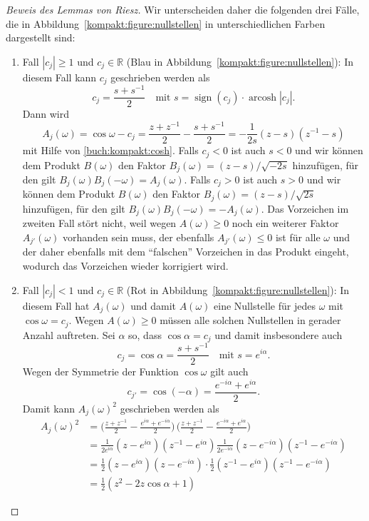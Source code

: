 \begin{proof}[Beweis des Lemmas von Riesz]
Wir unterscheiden daher die folgenden drei Fälle, die in
Abbildung~\ref{kompakt:figure:nullstellen} in unterschiedlichen Farben
dargestellt sind:
\begin{enumerate}
\item
Fall $|c_j|\ge 1$ und $c_j\in\mathbb R$ ({\color{blue}Blau} in
Abbildung~\ref{kompakt:figure:nullstellen}):
In diesem Fall kann $c_j$ geschrieben werden als
\[
c_j = \frac{s+s^{-1}}2
\quad
\text{mit $s=\operatorname{sign}(c_j)\cdot \operatorname{arcosh}|c_j|$.}
\]
Dann wird
\[
A_j(\omega)
=
\cos\omega - c_j
=
\frac{z+z^{-1}}2 - \frac{s+s^{-1}}2
=
-\frac1{2s} (z-s)(z^{-1}-s)
\]
mit Hilfe von \eqref{buch:kompakt:cosh}.
Falls $c_j < 0$ ist auch $s<0$ und wir können dem Produkt $B(\omega)$
den Faktor $B_j(\omega)=(z-s)/\sqrt{-2s}$ hinzufügen, für den gilt
$B_j(\omega)B_j(-\omega)=A_j(\omega)$.
Falls $c_j > 0$ ist auch $s>0$ und wir können dem Produkt $B(\omega)$
den Faktor $B_j(\omega) =(z-s)/\sqrt{2s}$ hinzufügen, für den
gilt $B_j(\omega)B_j(-\omega)=-A_j(\omega)$.
Das Vorzeichen im zweiten Fall stört nicht, weil wegen $A(\omega)\ge 0$
noch ein weiterer Faktor $A_{j'}(\omega)$ vorhanden sein muss, der ebenfalls
$A_{j'}(\omega)\le 0$ ist für alle $\omega$ und der daher ebenfalls
mit dem ``falschen'' Vorzeichen in das Produkt eingeht, wodurch das
Vorzeichen wieder korrigiert wird.
\item
Fall $|c_j| < 1$ und $c_j\in\mathbb R$ ({\color{red}Rot} in
Abbildung~\ref{kompakt:figure:nullstellen}):
In diesem Fall hat $A_j(\omega)$ und damit $A(\omega)$ eine Nullstelle
für jedes $\omega$ mit $\cos\omega=c_j$.
Wegen $A(\omega)\ge 0$ müssen alle solchen Nullstellen in gerader
Anzahl auftreten.
Sei $\alpha$ so, dass $\cos\alpha = c_j$ und damit insbesondere auch
\[
c_j
=
\cos\alpha
=
\frac{s+s^{-1}}2
\quad\text{mit $s=e^{i\alpha}$}.
\]
Wegen der Symmetrie der Funktion $\cos\omega$ gilt auch
\[
c_{j'}=
\cos(-\alpha)
=
\frac{e^{-i\alpha}+e^{i\alpha}}2.
\]
Damit kann $A_j(\omega)^2$ geschrieben werden als
\begin{align*}
A_j(\omega)^2
&=
\biggl(
\frac{z+z^{-1}}2-\frac{e^{i\alpha}+e^{-i\alpha}}2
\biggr)
\,
\biggl(
\frac{z+z^{-1}}2-\frac{e^{-i\alpha}+e^{i\alpha}}2
\biggr)
\\
&=
\frac{1}{2e^{i\alpha}}
(z-e^{i\alpha})
(z^{-1}-e^{i\alpha})
\frac{1}{2e^{-i\alpha}}
(z-e^{-i\alpha})
(z^{-1}-e^{-i\alpha})
\\
&=
\frac{1}{2}
(z-e^{i\alpha})
(z-e^{-i\alpha})
\cdot
\frac{1}{2}
(z^{-1}-e^{i\alpha})
(z^{-1}-e^{-i\alpha})
\\
&=
\frac{1}{2}
(z^2-2z\cos\alpha +1)

\end{align*}
\end{enumerate}
\end{proof}
